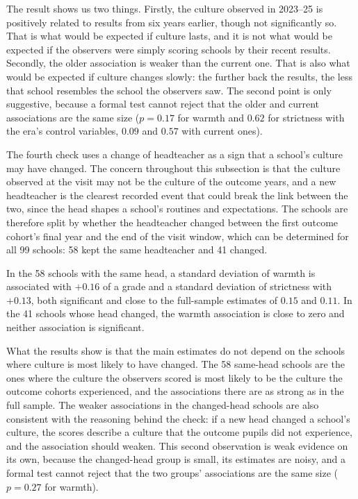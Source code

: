 The result shows us two things. Firstly, the culture observed in 2023--25 is positively related to results from six years earlier, though not significantly so. That is what would be expected if culture lasts, and it is not what would be expected if the observers were simply scoring schools by their recent results. Secondly, the older association is weaker than the current one. That is also what would be expected if culture changes slowly: the further back the results, the less that school resembles the school the observers saw. The second point is only suggestive, because a formal test cannot reject that the older and current associations are the same size ($p = 0.17$ for warmth and $0.62$ for strictness with the era's control variables, $0.09$ and $0.57$ with current ones).

The fourth check uses a change of headteacher as a sign that a school's culture may have changed. The concern throughout this subsection is that the culture observed at the visit may not be the culture of the outcome years, and a new headteacher is the clearest recorded event that could break the link between the two, since the head shapes a school's routines and expectations. The schools are therefore split by whether the headteacher changed between the first outcome cohort's final year and the end of the visit window, which can be determined for all 99 schools: 58 kept the same headteacher and 41 changed.

In the 58 schools with the same head, a standard deviation of warmth is associated with $+0.16$ of a grade and a standard deviation of strictness with $+0.13$, both significant and close to the full-sample estimates of $0.15$ and $0.11$. In the 41 schools whose head changed, the warmth association is close to zero and neither association is significant.

What the results show is that the main estimates do not depend on the schools where culture is most likely to have changed. The 58 same-head schools are the ones where the culture the observers scored is most likely to be the culture the outcome cohorts experienced, and the associations there are as strong as in the full sample. The weaker associations in the changed-head schools are also consistent with the reasoning behind the check: if a new head changed a school's culture, the scores describe a culture that the outcome pupils did not experience, and the association should weaken. This second observation is weak evidence on its own, because the changed-head group is small, its estimates are noisy, and a formal test cannot reject that the two groups' associations are the same size ($p = 0.27$ for warmth).

